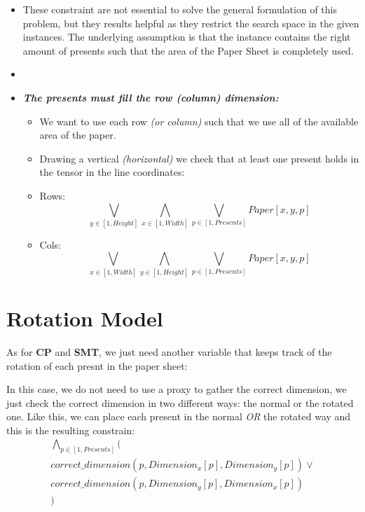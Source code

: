 \begin{itemize}
    \item[] These constraint are not essential to solve the general formulation of this problem,
        but they results helpful as they restrict the search space in the given instances.
        The underlying assumption is that the instance contains the right amount of presents such
        that the area of the Paper Sheet is completely used.
    \item \textbf{\textit{}}
    \item \textbf{\textit{The presents must fill the row (column) dimension:}}
        \begin{itemize}
            \item[] We want to use each row \textit{(or column)} such that we use all of the available area of the paper.
            \item[] Drawing a vertical \textit{(horizontal)} we check that at least one present holds in the tensor in the line coordinates:
            \item[] Rows: \begin{equation*}\bigvee_{y \in [1, Height]} \bigwedge_{x \in [1, Width]} \bigvee_{p \in [1, Presents]} Paper[x, y, p]\end{equation*}
            \item[] Cols: \begin{equation*}\bigvee_{x \in [1, Width]} \bigwedge_{y \in [1, Height]} \bigvee_{p \in [1, Presents]} Paper[x, y, p]\end{equation*}
        \end{itemize}
\end{itemize}



\section{Rotation Model}
As for \textbf{CP} and \textbf{SMT}, we just need another variable that keeps track of the rotation of each presnt in the paper sheet:

In this case, we do not need to use a proxy to gather the correct dimension, we just check the correct dimension in two different ways: the normal or the rotated one.
Like this, we can place each present in the normal \textit{OR} the rotated way and this is the resulting constrain: 
\begin{equation*}\begin{multlined}
    \bigwedge_{p \in [1, Presents]} (\\
        correct\_dimension(p, Dimension_x[p], Dimension_y[p]) \vee\\
        correct\_dimension(p, Dimension_y[p], Dimension_x[p]) \\
    )
\end{multlined}\end{equation*}  

